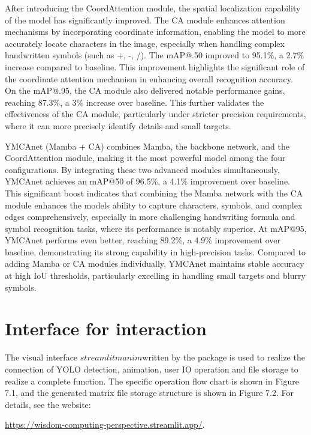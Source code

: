 \documentclass[
]{article}
\begin{document}
After introducing the CoordAttention module, the spatial localization
capability of the model has significantly improved. The CA module
enhances attention mechanisms by incorporating coordinate information,
enabling the model to more accurately locate characters in the image,
especially when handling complex handwritten symbols (such as +, -, /).
The mAP@.50 improved to 95.1\%, a 2.7\% increase compared to baseline.
This improvement highlights the significant role of the coordinate
attention mechanism in enhancing overall recognition accuracy. On the
mAP@.95, the CA module also delivered notable performance gains,
reaching 87.3\%, a 3\% increase over baseline. This further validates
the effectiveness of the CA module, particularly under stricter
precision requirements, where it can more precisely identify details and
small targets.

YMCAnet (Mamba + CA) combines Mamba, the backbone network, and the
CoordAttention module, making it the most powerful model among the four
configurations. By integrating these two advanced modules
simultaneously, YMCAnet achieves an mAP@50 of 96.5\%, a 4.1\%
improvement over baseline. This significant boost indicates that
combining the Mamba network with the CA module enhances the
model\textquotesingle s ability to capture characters, symbols, and
complex edges comprehensively, especially in more challenging
handwriting formula and symbol recognition tasks, where its performance
is notably superior. At mAP@95, YMCAnet performs even better, reaching
89.2\%, a 4.9\% improvement over baseline, demonstrating its strong
capability in high-precision tasks. Compared to adding Mamba or CA
modules individually, YMCAnet maintains stable accuracy at high IoU
thresholds, particularly excelling in handling small targets and blurry
symbols.

\section{Interface for interaction}\label{interface-for-interaction}

The visual interface \(streamlitmanim\)written by the package is used to
realize the connection of YOLO detection, animation, user IO operation
and file storage to realize a complete function. The specific operation
flow chart is shown in Figure 7.1, and the generated matrix file storage
structure is shown in Figure 7.2. For details, see the website:

\url{https://wisdom-computing-perspective.streamlit.app/}.
\end{document}
